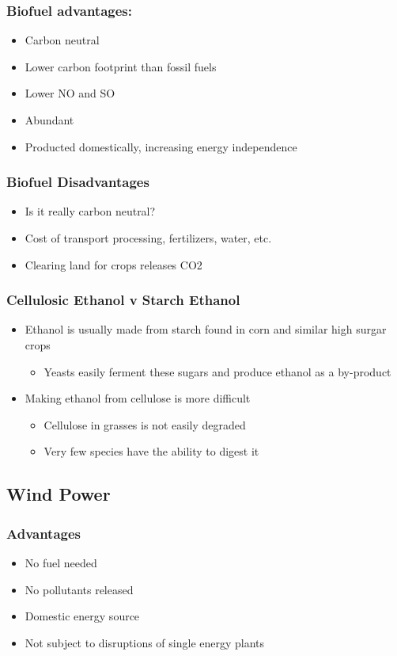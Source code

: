 \documentclass[11pt]{article}
\begin{document}
\subsubsection{Biofuel advantages:}
\label{sec:orgd36be4e}
\begin{itemize}
\item Carbon neutral
\item Lower carbon footprint than fossil fuels
\item Lower NO and SO
\item Abundant
\item Producted domestically, increasing energy independence
\end{itemize}
\subsubsection{Biofuel Disadvantages}
\label{sec:org5ac32bf}
\begin{itemize}
\item Is it really carbon neutral?
\item Cost of transport processing, fertilizers, water, etc.
\item Clearing land for crops releases CO2
\end{itemize}
\subsubsection{Cellulosic Ethanol v Starch Ethanol}
\label{sec:org96e72d7}
\begin{itemize}
\item Ethanol is usually made from starch found in corn and similar high surgar crops
\begin{itemize}
\item Yeasts easily ferment these sugars and produce ethanol as a by-product
\end{itemize}
\item Making ethanol from cellulose is more difficult
\begin{itemize}
\item Cellulose in grasses is not easily degraded
\item Very few species have the ability to digest it
\end{itemize}
\end{itemize}
\subsection{Wind Power}
\label{sec:org666f990}
\subsubsection{Advantages}
\label{sec:org1faedb3}
\begin{itemize}
\item No fuel needed
\item No pollutants released
\item Domestic energy source
\item Not subject to disruptions of single energy plants
\end{itemize}
\end{document}
